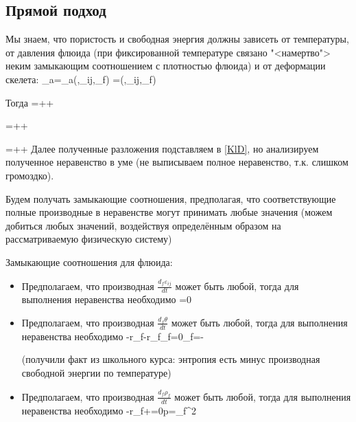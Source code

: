 \documentclass[main.tex]{subfiles}
\begin{document}
\subsection{Прямой подход}

Мы знаем, что пористость и свободная энергия должны зависеть от температуры, от давления флюида (при фиксированной температуре связано "<намертво"> неким замыкающим соотношением с плотностью флюида) и от деформации скелета:
\beq
\Psi_a=\Psi_a\left(\theta,\varepsilon_{ij},\rho_f\right)
\eeq
\beq
\varphi=\varphi\left(\theta,\varepsilon_{ij},\rho_f\right)
\eeq

Тогда
\beq
{}=++
\eeq

\beq
{}=++
\eeq

\beq
{}=\frac{\partial\varphi}{\partial\theta}++
\eeq
Далее полученные разложения подставляем в \eqref{KlD}, но анализируем полученное неравенство в уме (не выписываем полное неравенство, т.к. слишком громоздко).

Будем получать замыкающие соотношения, предполагая, что соответствующие полные производные в неравенстве могут принимать любые значения (можем добиться любых значений, воздействуя определённым образом на рассматриваемую физическую систему)

Замыкающие соотношения для флюида:

\begin{itemize}
\item Предполагаем, что производная $\displaystyle{}\frac{d_f\varepsilon_{ij}}{dt}$ может быть любой, тогда для выполнения неравенства необходимо
\beq\label{FirstFluid1}
=0
\eeq

\item Предполагаем, что производная $\displaystyle{}\frac{d_f\theta}{dt}$ может быть любой, тогда для выполнения неравенства необходимо 
\beq\label{FirstFluid2}
-r_f-r_f\eta_f=0\Rightarrow\eta_f=-
\eeq

(получили факт из школьного курса: энтропия есть минус производная свободной энергии по температуре)

\item Предполагаем, что производная $\displaystyle{}\frac{d_f\rho_f}{dt}$ может быть любой, тогда для выполнения неравенства необходимо 
\beq\label{FirstFluid3}
-r_f+=0\Rightarrow p=\rho_f^2
\eeq

\end{itemize}
\end{document}
